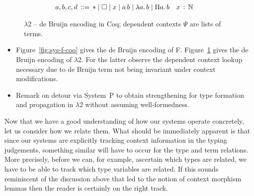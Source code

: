 \documentclass[a4paper,UKenglish]{lipics-v2016}
\makeatletter
\newcommand{\ms}{\,}
\newcommand{\mrel}[1]{\mathrel{\ms #1 \ms}}
\newcommand{\Nat}{\mathbb{N}}
\newcommand{\OF}{\mrel{:}}
\newcommand{\bnfdef}{\mrel{::=}}
\newcommand{\SysL}{$\lambda$2\xspace}
\newcommand{\of}{\ensuremath{\!:\!}}
\newcommand{\raisemath}[1]{\mathpalette{\raisem@th{#1}}}
\newcommand{\raisem@th}[3]{\raisebox{#1}{\ensuremath{#2#3}}}
\newcommand{\tsAnnot}[2]{\vdash\hspace{-.7em}^{\raisemath{1.5pt}{\scriptscriptstyle{#2}}}_{\raisemath{0.3pt}{\scriptscriptstyle{#1}}}} %
\newcommand{\tyL}{\tsAnnot{\lambda}{}} %
\newcommand{\typingL}[3]{\ensuremath{{#1} \mathrel{\tyL} #2 \OF #3}}
\newcommand{\inL}{\mrel{\in_{\lambda}}}
\newcommand{\Prp}{\ensuremath{\textrm{\textasteriskcentered}}}
\newcommand{\Typ}{\ensuremath{\square}}
\newcommand{\Lam}[1]{\ensuremath{\lambda #1.\,}}
\newcommand{\Prod}[1]{\ensuremath{\Pi #1.\,}}
\newcommand{\subst}[1]{\hphantom{|}\!\![{#1}]}
\newcommand{\scons}{\mathbin{\hspace{0.05em}\cdot\hspace{0.05em}}}
\newcommand{\id}{\mathsf{id}}
\newcommand{\shift}{\ensuremath{\hspace{0.1em}\mathsf{+}\hspace{0.08em}\!1}}
\makeatother
\begin{document}
\begin{figure}
  \begin{center}
    \begin{align*}
      a, b, c, d &\bnfdef \Prp \mid \Typ \mid x \mid a\,b \mid \Lam a b \mid \Prod a b & &x \OF \Nat
    \end{align*}
  \end{center}
  \caption{\SysL{} -- de Bruijn encoding in Coq; dependent contexts $\Psi$ are lists of terms.}
  \label{fig:sys-l-coq}
\end{figure}

\begin{itemize}
\item Figure~\ref{fig:sys-f-coq} gives the de Bruijn encoding of F.
  Figure~\ref{fig:sys-l-coq} gives the de Bruijn encoding of \SysL.
  For the latter observe the dependent context lookup necessary due to de Bruijn term not being invariant under context modifications.
\item Remark on detour via System~P to obtain strengthening for type formation and propagation in \SysL without assuming well-formedness.
\end{itemize}

Now that we have a good understanding of how our systems operate concretely, let us consider how we relate them.
What should be immediately apparent is that since our systems are explicitly tracking context information in the typing judgements, something similar will have to occur for the type and term relations.
More precisely, before we can, for example, ascertain which types are related, we have to be able to track which type variables are related.
If this sounds reminiscent of the discussion above that led to the notion of context morphism lemmas then the reader is certainly on the right track.
\end{document}
